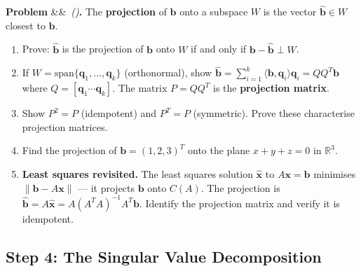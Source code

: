 \documentclass[12pt,a4paper]{article}
\newcounter{problem}
\newenvironment{problem}[1][]{\refstepcounter{problem}\par\vspace{6pt}\noindent\textbf{\color{MidBlue}Problem \theproblem}\ifx&#1&\else\ \textit{(#1)}\fi\textbf{.}\enskip}{\par\vspace{4pt}}
\begin{document}
\begin{problem}
The \textbf{projection} of $\mathbf{b}$ onto a subspace $W$ is the vector $\hat{\mathbf{b}} \in W$ closest to $\mathbf{b}$.

\begin{enumerate}[label=(\alph*),topsep=2pt]
  \item Prove: $\hat{\mathbf{b}}$ is the projection of $\mathbf{b}$ onto $W$ if and only if $\mathbf{b} - \hat{\mathbf{b}} \perp W$.
  \item If $W = \text{span}\{\mathbf{q}_1,\ldots,\mathbf{q}_k\}$ (orthonormal), show $\hat{\mathbf{b}} = \sum_{i=1}^k\langle\mathbf{b},\mathbf{q}_i\rangle\mathbf{q}_i = QQ^T\mathbf{b}$ where $Q=[\mathbf{q}_1\cdots\mathbf{q}_k]$. The matrix $P=QQ^T$ is the \textbf{projection matrix}.
  \item Show $P^2=P$ (idempotent) and $P^T=P$ (symmetric). Prove these characterise projection matrices.
  \item Find the projection of $\mathbf{b}=(1,2,3)^T$ onto the plane $x+y+z=0$ in $\mathbb{R}^3$.
  \item \textbf{Least squares revisited.} The least squares solution $\hat{\mathbf{x}}$ to $A\mathbf{x}=\mathbf{b}$ minimises $\|\mathbf{b}-A\mathbf{x}\|$ --- it projects $\mathbf{b}$ onto $C(A)$. The projection is $\hat{\mathbf{b}}=A\hat{\mathbf{x}}=A(A^TA)^{-1}A^T\mathbf{b}$. Identify the projection matrix and verify it is idempotent.
\end{enumerate}
\end{problem}

\begin{center}
\end{center}

\subsection{Step 4: The Singular Value Decomposition}
\end{document}
